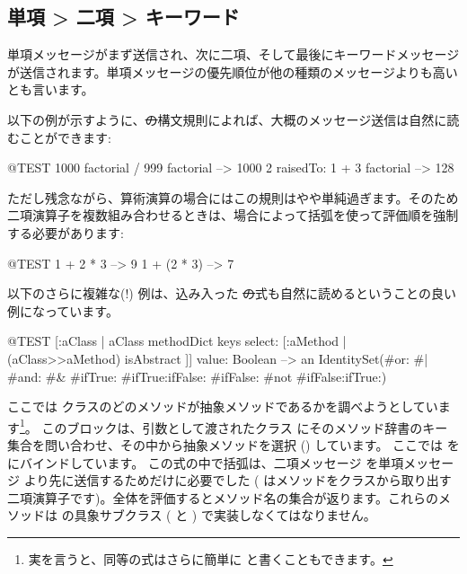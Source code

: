 \documentclass[a4paper,10pt,twoside]{book}
\begin{document}
\subsection*{単項 > 二項 > キーワード}
単項メッセージがまず送信され、次に二項、そして最後にキーワードメッセージが送信されます。単項メッセージの優先順位が他の種類のメッセージよりも高いとも言います。


以下の例が示すように、\st の構文規則によれば、大概のメッセージ送信は自然に読むことができます:
\begin{code}{@TEST}
1000 factorial / 999 factorial --> 1000
2 raisedTo: 1 + 3 factorial     --> 128
\end{code}
\noindent

ただし残念ながら、算術演算の場合にはこの規則はやや単純過ぎます。そのため二項演算子を複数組み合わせるときは、場合によって括弧を使って評価順を強制する必要があります:
\begin{code}{@TEST}
1 + 2 * 3   --> 9
1 + (2 * 3) --> 7
\end{code}

以下のさらに複雑な(!) 例は、込み入った \st の式も自然に読めるということの良い例になっています。
\begin{code}{@TEST}
[:aClass | aClass methodDict keys select: [:aMethod | (aClass>>aMethod) isAbstract ]] value: Boolean --> an IdentitySet(#or: #| #and: #& #ifTrue: #ifTrue:ifFalse: #ifFalse: #not #ifFalse:ifTrue:)
\end{code}
\noindent
ここでは  クラスのどのメソッドが抽象メソッドであるかを調べようとしています\footnote{実を言うと、同等の式はさらに簡単に  と書くこともできます。}。
このブロックは、引数として渡されたクラス  にそのメソッド辞書のキー集合を問い合わせ、その中から抽象メソッドを選択 () しています。
ここでは  を  にバインドしています。
この式の中で括弧は、二項メッセージ \ct{>>} を単項メッセージ \mbox{} より先に送信するためだけに必要でした (\ct{>>} はメソッドをクラスから取り出す二項演算子です)。全体を評価するとメソッド名の集合が返ります。これらのメソッドは  の具象サブクラス ( と ) で実装しなくてはなりません。
\end{document}
